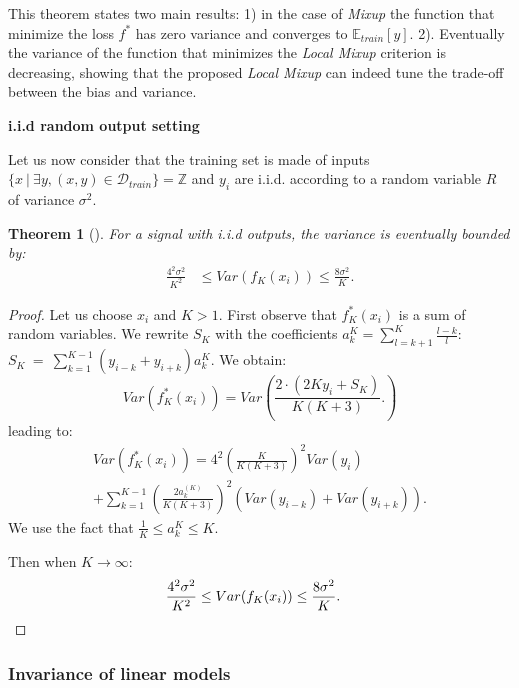 \documentclass[twoside]{article}
\newtheorem{theorem}{Theorem}[section]
\numberwithin{intassumption}{assumption}
\begin{document}
This theorem states two main results: 1) in the case of \emph{Mixup} the function that minimize the loss $f^*$ has zero variance and converges to $\mathbb{E}_{train}[y]$. 2). Eventually the variance of the function that minimizes the \emph{Local Mixup} criterion is decreasing, showing that the proposed \emph{Local Mixup} can indeed tune the trade-off between the bias and variance.

\textbf{i.i.d random output setting}

Let us now consider that the training set is made of inputs $\{x \ \vert \ \exists y, (x,y) \in \mathcal{D}_{train}\} = \mathbb{Z}$ and $y_i$ are i.i.d. according to a random variable $R$ of variance $\sigma^2$.

\begin{theorem}[]
For a signal with i.i.d outputs, the variance is eventually bounded by:
\begin{align}
     \frac{4^2\sigma^2}{K^2} &\leq Var(f_K(x_i)) \leq \frac{ 8\sigma^2}{K}.
\end{align}

\end{theorem}

\begin{proof}
Let us choose $x_i$ and $K>1$. First observe that $f^*_K(x_i)$ is a sum of random variables. 
We rewrite $S_K$ with the coefficients $a_k^{K}= \sum_{l=k+1}^K \frac{l-k}{l}$: $S_K~=~\sum_{k =1}^{K-1} (y_{i-k}+y_{i+k}) a_k^{K}$. We obtain:
\begin{equation*}
    Var(f^*_K(x_i)) = Var\left( \frac{2\cdot(2Ky_i + S_K)}{K(K+3)}. \right)
    \end{equation*}
leading to:
\begin{align*}
    Var(f^*_K(x_i))= 4^2\left( \frac{K}{K(K+3)} \right)^2Var(y_i) \\ + \sum_{k=1}^{K-1}\left(\frac{2a_k^{(K)}}{K(K+3)}\right)^2 (Var(y_{i-k}) + Var(y_{i+k})).
\end{align*}
We use the fact that $\frac{1}{K}\leq  a_k^{K} \leq K$.

Then when $K \to \infty$:
\begin{align*}
\frac{4^2\sigma^2}{K^2} &\leq Var(f_K(x_i)) \leq \frac{ 8\sigma^2}{K}.\qedhere
\end{align*} 
\end{proof}

\subsubsection{Invariance of linear models}
\end{document}
